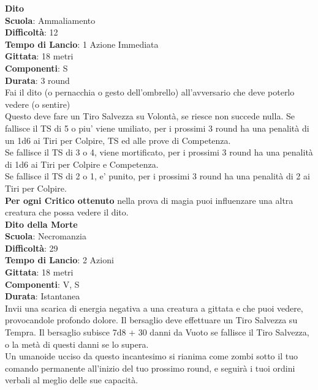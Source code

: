 \begin{multicols}{2}
\medskip\textbf{Dito}\\
\textbf{Scuola}: Ammaliamento\\
\textbf{Difficoltà}: 12\\
\textbf{Tempo di Lancio}: 1 Azione Immediata\\
\textbf{Gittata}: 18 metri\\
\textbf{Componenti}: S\\
\textbf{Durata}: 3 round\\
Fai il dito (o pernacchia o gesto dell'ombrello) all'avversario che deve poterlo vedere (o sentire)\\
Questo deve fare un Tiro Salvezza su Volontà, se riesce non succede nulla.
Se fallisce il TS di 5 o piu' viene umiliato, per i prossimi 3 round ha una penalità di un 1d6 ai Tiri per Colpire, TS ed alle prove di Competenza.\\
Se fallisce il TS di 3 o 4, viene mortificato, per i prossimi 3 round ha una penalità di 1d6 ai Tiri per Colpire e Competenza.\\
Se fallisce il TS di 2 o 1, e' punito, per i prossimi 3 round ha una penalità di 2 ai Tiri per Colpire.\\
\textbf{Per ogni Critico ottenuto} nella prova di magia puoi influenzare una altra creatura che possa vedere il dito.\\

\medskip\textbf{Dito della Morte}\\
\textbf{Scuola}: Necromanzia\\
\textbf{Difficoltà}: 29\\
\textbf{Tempo di Lancio}: 2 Azioni\\
\textbf{Gittata}: 18 metri\\
\textbf{Componenti}: V, S\\
\textbf{Durata}: Istantanea\\
Invii una scarica di energia negativa a una creatura a gittata e che puoi vedere, provocandole profondo dolore. Il bersaglio deve effettuare un Tiro Salvezza su Tempra. Il bersaglio subisce 7d8 + 30 danni da Vuoto se fallisce il Tiro Salvezza, o la metà di questi danni se lo supera.\\
Un umanoide ucciso da questo incantesimo si rianima come zombi sotto il tuo comando permanente all'inizio del tuo prossimo round, e seguirà i tuoi ordini verbali al meglio delle sue capacità.


\end{multicols}
